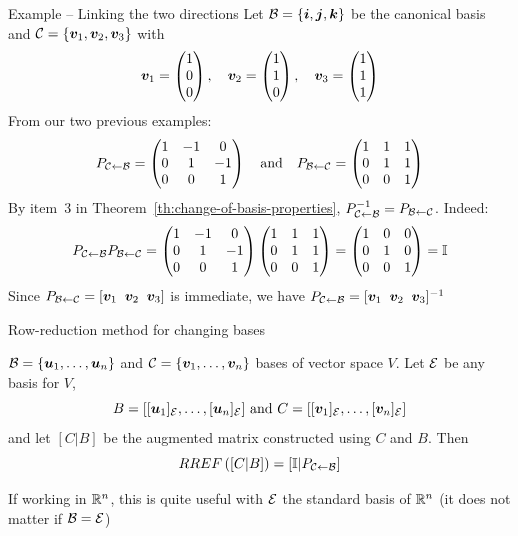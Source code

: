 \documentclass[aspectratio=169]{beamer}\usepackage[]{graphicx}\usepackage[]{xcolor}
\begin{document}
\begin{frame}{Example -- Linking the two directions}
Let $\mathcal{B}=\{\bm{i},\bm{j},\bm{k}\}$ be the canonical basis and $\mathcal{C}=\{\bm{v}_1,\bm{v}_2,\bm{v}_3\}$ with
\[
\bm{v}_1 = \begin{pmatrix} 1 \\ 0 \\ 0 \end{pmatrix}, \quad
\bm{v}_2 = \begin{pmatrix} 1 \\ 1 \\ 0 \end{pmatrix}, \quad
\bm{v}_3 = \begin{pmatrix} 1 \\ 1 \\ 1 \end{pmatrix}
\]
\vfill
From our two previous examples:
\[
P_{\mathcal{C}\leftarrow\mathcal{B}} = \begin{pmatrix} 1 & -1 & 0 \\ 0 & 1 & -1 \\ 0 & 0 & 1 \end{pmatrix}
\quad\text{and}\quad
P_{\mathcal{B}\leftarrow\mathcal{C}} = \begin{pmatrix} 1 & 1 & 1 \\ 0 & 1 & 1 \\ 0 & 0 & 1 \end{pmatrix}
\]
\vfill
By item~3 in Theorem~\ref{th:change-of-basis-properties}, $P_{\mathcal{C}\leftarrow\mathcal{B}}^{-1} = P_{\mathcal{B}\leftarrow\mathcal{C}}$. Indeed:
\[
P_{\mathcal{C}\leftarrow\mathcal{B}} P_{\mathcal{B}\leftarrow\mathcal{C}}
= \begin{pmatrix} 1 & -1 & 0 \\ 0 & 1 & -1 \\ 0 & 0 & 1 \end{pmatrix}
\begin{pmatrix} 1 & 1 & 1 \\ 0 & 1 & 1 \\ 0 & 0 & 1 \end{pmatrix}
= \begin{pmatrix} 1 & 0 & 0 \\ 0 & 1 & 0 \\ 0 & 0 & 1 \end{pmatrix} = \mathbb{I}
\]
\vfill
Since $P_{\mathcal{B}\leftarrow\mathcal{C}} = [\bm{v}_1 \;\; \bm{v}_2 \;\; \bm{v}_3]$ is immediate, we have $P_{\mathcal{C}\leftarrow\mathcal{B}} = [\bm{v}_1 \;\; \bm{v}_2 \;\; \bm{v}_3]^{-1}$
\end{frame}


\begin{frame}{Row-reduction method for changing bases}
\begin{importanttheorem}
\label{th:change-basis-construction}
$\mathcal{B}=\{\bm{u}_1,\ldots,\bm{u}_n\}$ and $\mathcal{C}=\{\bm{v}_1,\ldots,\bm{v}_n\}$ bases of vector space $V$. Let $\mathcal{E}$ be any basis for $V$,
\[
B = [[\bm{u}_1]_{\mathcal{E}},\ldots,[\bm{u}_n]_{\mathcal{E}}] 
\textrm{ and }
C = [[\bm{v}_1]_{\mathcal{E}},\ldots,[\bm{v}_n]_{\mathcal{E}}] 
\]
and let $[C|B]$ be the augmented matrix constructed using $C$ and $B$. Then
\[
RREF\left([C|B]\right)
=[\mathbb{I}|P_{\mathcal{C}\leftarrow\mathcal{B}}]
\]
\end{importanttheorem}
\vfill
If working in $\mathbb{R}^n$, this is quite useful with $\mathcal{E}$ the standard basis of $\mathbb{R}^n$ (it does not matter if $\mathcal{B}=\mathcal{E}$)
\end{frame}
\end{document}
